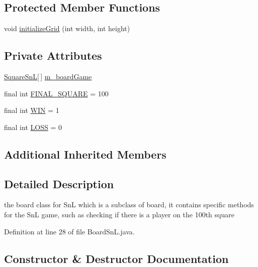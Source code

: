 \subsection*{Protected Member Functions}
\begin{DoxyCompactItemize}
\item 
void \hyperlink{class_board_1_1_board_sn_l_a934454d70accef26911914261147d8f5}{initialize\+Grid} (int width, int height)
\end{DoxyCompactItemize}
\subsection*{Private Attributes}
\begin{DoxyCompactItemize}
\item 
\hyperlink{class_square_1_1_square_sn_l}{Square\+Sn\+L}\mbox{[}$\,$\mbox{]} \hyperlink{class_board_1_1_board_sn_l_a98423adeb63e796de2d496689b4ce8e1}{m\+\_\+board\+Game}
\item 
final int \hyperlink{class_board_1_1_board_sn_l_a133b0d6726fc954ea12a66b4369e3fa6}{F\+I\+N\+A\+L\+\_\+\+S\+Q\+U\+A\+R\+E} = 100
\item 
final int \hyperlink{class_board_1_1_board_sn_l_a9f3b27889e40b337a28438224a5fab4b}{W\+I\+N} = 1
\item 
final int \hyperlink{class_board_1_1_board_sn_l_aa6138411eddcd92ae999cff9fc34acb7}{L\+O\+S\+S} = 0
\end{DoxyCompactItemize}
\subsection*{Additional Inherited Members}


\subsection{Detailed Description}
the board class for Sn\+L which is a subclass of board, it contains specific methods for the Sn\+L game, such as checking if there is a player on the 100th square 

Definition at line 28 of file Board\+Sn\+L.\+java.



\subsection{Constructor \& Destructor Documentation}
\hypertarget{class_board_1_1_board_sn_l_a03f7b8911496b68ad4de0d1b0939220a}{}
